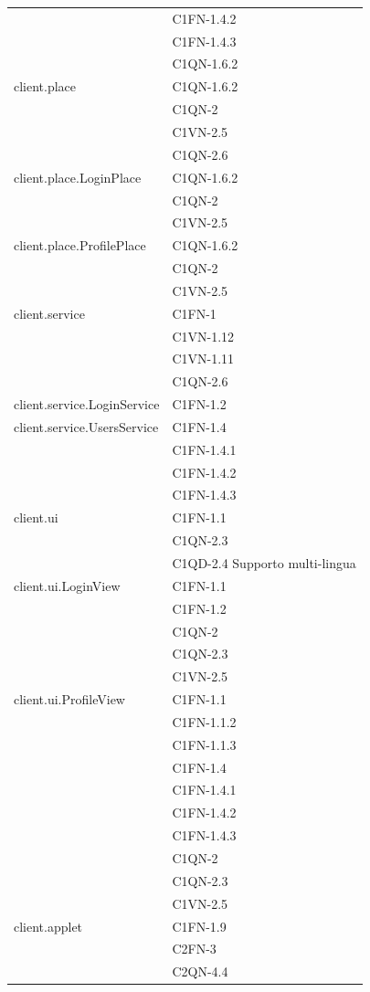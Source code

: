 \begin{footnotesize}
\begin{longtable}[!h]{|l|l|}
& C1FN-1.4.2\\
& C1FN-1.4.3\\
& C1QN-1.6.2\\\hline
client.place  &  C1QN-1.6.2\\
& C1QN-2 \\
& C1VN-2.5\\
& C1QN-2.6\\\hline 
client.place.LoginPlace  &  C1QN-1.6.2\\
& C1QN-2 \\
& C1VN-2.5\\\hline 
client.place.ProfilePlace  &  C1QN-1.6.2\\
& C1QN-2\\
& C1VN-2.5\\\hline
client.service  &  C1FN-1\\
& C1VN-1.12\\
& C1VN-1.11\\
& C1QN-2.6 \\\hline 
client.service.LoginService  &  C1FN-1.2 \\\hline 
client.service.UsersService  &  C1FN-1.4\\
& C1FN-1.4.1\\
& C1FN-1.4.2\\
& C1FN-1.4.3\\\hline 
client.ui  &  C1FN-1.1\\
& C1QN-2.3\\
& C1QD-2.4 Supporto multi-lingua\\\hline
client.ui.LoginView  &  C1FN-1.1\\
& C1FN-1.2\\
& C1QN-2\\
& C1QN-2.3\\
& C1VN-2.5\\\hline 
client.ui.ProfileView  & C1FN-1.1\\
& C1FN-1.1.2\\
& C1FN-1.1.3\\
& C1FN-1.4\\
& C1FN-1.4.1\\
& C1FN-1.4.2\\
& C1FN-1.4.3\\
& C1QN-2\\
& C1QN-2.3\\
& C1VN-2.5\\\hline 
client.applet  &  C1FN-1.9\\
& C2FN-3\\
& C2QN-4.4\\

\end{longtable}
\end{footnotesize}
